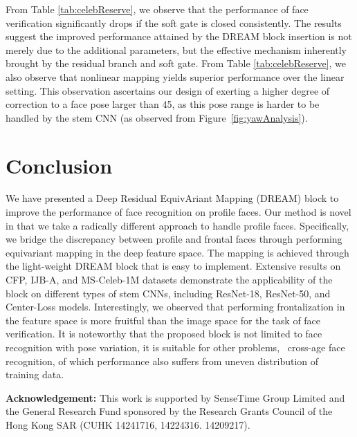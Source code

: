 \documentclass[10pt,twocolumn,letterpaper]{article}
\begin{document}
From Table \ref{tab:celebReserve}, we observe that the performance of face verification significantly drops if the soft gate is closed consistently.
The results suggest the improved performance attained by the DREAM block insertion is not merely due to the additional parameters, but the effective mechanism inherently brought by the residual branch and soft gate.
From Table \ref{tab:celebReserve}, we also observe that nonlinear mapping yields superior performance over the linear setting. This observation ascertains our design of exerting a higher degree of correction to a face pose larger than 45, as this pose range is harder to be handled by the stem CNN (as observed from Figure~\ref{fig:yawAnalysis}). 






\section{Conclusion}


We have presented a Deep Residual EquivAriant Mapping (DREAM) block to improve the performance of face recognition on profile faces. 
Our method is novel in that we take a radically different approach to handle profile faces. 
Specifically, we bridge the discrepancy between profile and frontal faces through performing equivariant mapping in the deep feature space. The mapping is achieved through the light-weight DREAM block that is easy to implement. Extensive results on CFP, IJB-A, and MS-Celeb-1M datasets demonstrate the applicability of the block on different types of stem CNNs, including ResNet-18, ResNet-50, and Center-Loss models. Interestingly, we observed that performing frontalization in the feature space is more fruitful than the image space for the task of face verification.
It is noteworthy that the proposed block is not limited to face recognition with pose variation, it is suitable for other problems, \eg~cross-age face recognition, of which performance also suffers from uneven distribution of training data. 

\vspace{0.15cm}
\noindent \textbf{Acknowledgement:} This work is supported by SenseTime Group Limited and the General Research Fund sponsored by the Research Grants Council of the Hong Kong SAR (CUHK 14241716, 14224316. 14209217). 


\newpage




{\small


}
\end{document}
